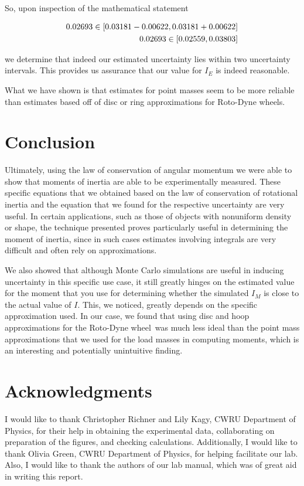 \documentclass[coverpage]{article}
\newcommand{\rwheel}{Roto-Dyne wheel}
\begin{document}
	So, upon inspection of the mathematical statement
	
	\begin{align}
		0.02693 \in [0.03181 - 0.00622, 0.03181 + 0.00622] \notag \\
		0.02693 \in [0.02559, 0.03803] \notag \\
	\end{align}

	we determine that indeed our estimated uncertainty lies within two uncertainty intervals. This provides us assurance that our value for $I_E$ is indeed reasonable. 
	
	What we have shown is that estimates for point masses seem to be more reliable than estimates based off of disc or ring approximations for \rwheel s.
	
	\section{Conclusion}
	
	Ultimately, using the law of conservation of angular momentum we were able to show that moments of inertia are able to be experimentally measured. These specific equations that we obtained based on the law of conservation of rotational inertia and the equation that we found for the respective uncertainty are very useful. In certain applications, such as those of objects with nonuniform density or shape, the technique presented proves particularly useful in determining the moment of inertia, since in such cases estimates involving integrals are very difficult and often rely on approximations. 
	
	We also showed that although Monte Carlo simulations are useful in inducing uncertainty in this specific use case, it still greatly hinges on the estimated value for the moment that you use for determining whether the simulated $I_M$ is close to the actual value of $I$. This, we noticed, greatly depends on the specific approximation used. In our case, we found that using disc and hoop approximations for the \rwheel~was much less ideal than the point mass approximations that we used for the load masses in computing moments, which is an interesting and potentially unintuitive finding.
	
	\section*{Acknowledgments}
	I would like to thank Christopher Richner and Lily Kagy, CWRU Department of Physics, for their help in obtaining the experimental data, collaborating on preparation of the figures, and checking calculations. Additionally, I would like to thank Olivia Green, CWRU Department of Physics, for helping facilitate our lab. Also, I would like to thank the authors of our lab manual, which was of great aid in writing this report.
	
\end{document}
